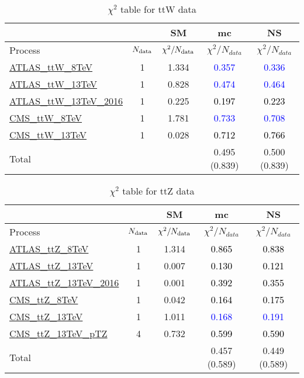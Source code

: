 \documentclass{article}
\begin{document}
\begin{table}[H]
\centering
\begin{tabular}{|l|c|c|c|c|}
\hline
 \multicolumn{2}{|c|}{} & SM& mc& NS\\ \hline
Process & $N_{\rm data}$ & $\chi^ 2/N_{\rm data}$& $\chi^ 2/N_{data}$& $\chi^ 2/N_{data}$\\ \hline
\href{https://arxiv.org/abs/1509.05276}{ATLAS_ttW_8TeV} & 1 & 1.334 & \textcolor{blue}{0.357} & \textcolor{blue}{0.336} \\ \hline
\href{https://arxiv.org/abs/1609.01599}{ATLAS_ttW_13TeV} & 1 & 0.828 & \textcolor{blue}{0.474} & \textcolor{blue}{0.464} \\ \hline
\href{https://arxiv.org/abs/1901.03584}{ATLAS_ttW_13TeV_2016} & 1 & 0.225 & \textcolor{black}{0.197} & \textcolor{black}{0.223} \\ \hline
\href{https://arxiv.org/abs/1510.01131}{CMS_ttW_8TeV} & 1 & 1.781 & \textcolor{blue}{0.733} & \textcolor{blue}{0.708} \\ \hline
\href{https://arxiv.org/abs/1711.02547}{CMS_ttW_13TeV} & 1 & 0.028 & \textcolor{black}{0.712} & \textcolor{black}{0.766} \\ \hline
\hline Total & &  & 0.495 (0.839) & 0.500 (0.839) \\ \hline
\end{tabular}
\caption{$\chi^2$ table for ttW data}
\end{table}
\begin{table}[H]
\centering
\begin{tabular}{|l|c|c|c|c|}
\hline
 \multicolumn{2}{|c|}{} & SM& mc& NS\\ \hline
Process & $N_{\rm data}$ & $\chi^ 2/N_{\rm data}$& $\chi^ 2/N_{data}$& $\chi^ 2/N_{data}$\\ \hline
\href{https://arxiv.org/abs/1509.05276}{ATLAS_ttZ_8TeV} & 1 & 1.314 & \textcolor{black}{0.865} & \textcolor{black}{0.838} \\ \hline
\href{https://arxiv.org/abs/1609.01599}{ATLAS_ttZ_13TeV} & 1 & 0.007 & \textcolor{black}{0.130} & \textcolor{black}{0.121} \\ \hline
\href{https://arxiv.org/abs/1901.03584}{ATLAS_ttZ_13TeV_2016} & 1 & 0.001 & \textcolor{black}{0.392} & \textcolor{black}{0.355} \\ \hline
\href{https://arxiv.org/abs/1510.01131}{CMS_ttZ_8TeV} & 1 & 0.042 & \textcolor{black}{0.164} & \textcolor{black}{0.175} \\ \hline
\href{https://arxiv.org/abs/1711.02547}{CMS_ttZ_13TeV} & 1 & 1.011 & \textcolor{blue}{0.168} & \textcolor{blue}{0.191} \\ \hline
\href{https://arxiv.org/abs/1907.11270}{CMS_ttZ_13TeV_pTZ} & 4 & 0.732 & \textcolor{black}{0.599} & \textcolor{black}{0.590} \\ \hline
\hline Total & &  & 0.457 (0.589) & 0.449 (0.589) \\ \hline
\end{tabular}
\caption{$\chi^2$ table for ttZ data}
\end{table}
\end{document}
